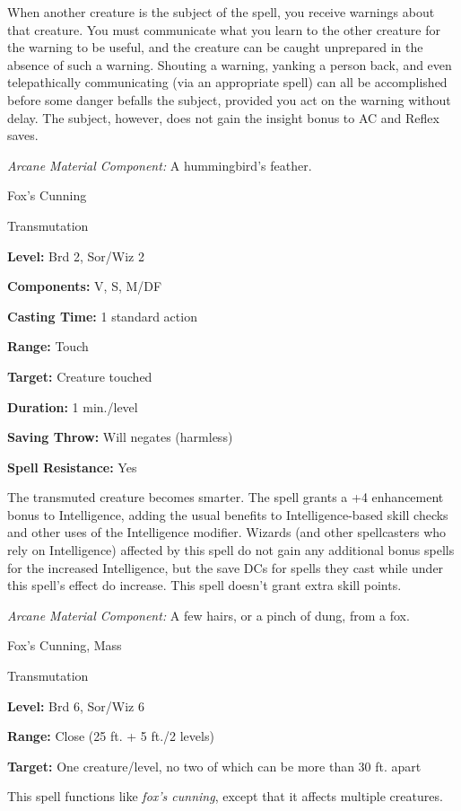 \documentclass{article}
\begin{document}
When another creature is the subject of the spell, you receive warnings about that 
creature. You must communicate what you learn to the other creature for the warning 
to be useful, and the creature can be caught unprepared in the absence of such 
a warning. Shouting a warning, yanking a person back, and even telepathically communicating 
(via an appropriate spell) can all be accomplished before some danger befalls the 
subject, provided you act on the warning without delay. The subject, however, does 
not gain the insight bonus to AC and Reflex saves.

\textit{Arcane Material Component: }A hummingbird's feather.

\vspace{12pt}
Fox's Cunning

Transmutation

\textbf{Level:} Brd 2, Sor/Wiz 2

\textbf{Components:} V, S, M/DF

\textbf{Casting Time:} 1 standard action

\textbf{Range:} Touch

\textbf{Target:} Creature touched

\textbf{Duration:} 1 min./level

\textbf{Saving Throw: }Will negates (harmless)

\textbf{Spell Resistance:} Yes

The transmuted creature becomes smarter. The spell grants a +4 enhancement bonus 
to Intelligence, adding the usual benefits to Intelligence-based skill checks and 
other uses of the Intelligence modifier. Wizards (and other spellcasters who rely 
on Intelligence) affected by this spell do not gain any additional bonus spells 
for the increased Intelligence, but the save DCs for spells they cast while under 
this spell's effect do increase. This spell doesn't grant extra skill points.

\textit{Arcane Material Component: }A few hairs, or a pinch of dung, from a fox.

\vspace{12pt}
Fox's Cunning, Mass

Transmutation

\textbf{Level:} Brd 6, Sor/Wiz 6

\textbf{Range:} Close (25 ft. + 5 ft./2 levels)

\textbf{Target:} One creature/level, no two of which can be more than 30 ft. apart

This spell functions like \textit{fox's cunning}, except that it affects multiple 
creatures.
\end{document}
